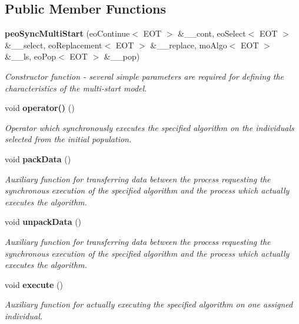 \subsection*{Public Member Functions}
\begin{CompactItemize}
\item 
{\bf peo\-Sync\-Multi\-Start} (eo\-Continue$<$ EOT $>$ \&\_\-\_\-cont, eo\-Select$<$ EOT $>$ \&\_\-\_\-select, eo\-Replacement$<$ EOT $>$ \&\_\-\_\-replace, mo\-Algo$<$ EOT $>$ \&\_\-\_\-ls, eo\-Pop$<$ EOT $>$ \&\_\-\_\-pop)
\begin{CompactList}\small\item\em Constructor function - several simple parameters are required for defining the characteristics of the multi-start model. \item\end{CompactList}\item 
void {\bf operator()} ()
\begin{CompactList}\small\item\em Operator which synchronously executes the specified algorithm on the individuals selected from the initial population. \item\end{CompactList}\item 
void {\bf pack\-Data} ()
\begin{CompactList}\small\item\em Auxiliary function for transferring data between the process requesting the synchronous execution of the specified algorithm and the process which actually executes the algorithm. \item\end{CompactList}\item 
void {\bf unpack\-Data} ()
\begin{CompactList}\small\item\em Auxiliary function for transferring data between the process requesting the synchronous execution of the specified algorithm and the process which actually executes the algorithm. \item\end{CompactList}\item 
void {\bf execute} ()
\begin{CompactList}\small\item\em Auxiliary function for actually executing the specified algorithm on one assigned individual. \item\end{CompactList}\item 

\end{CompactItemize}
